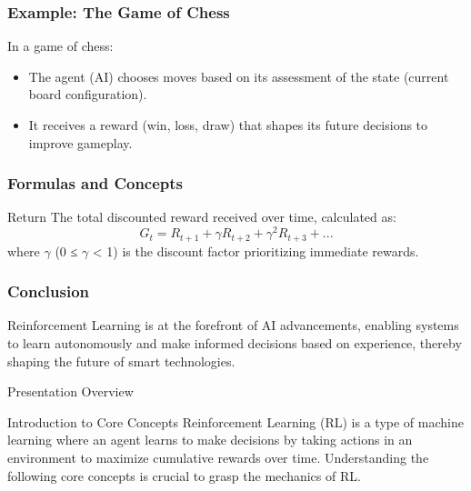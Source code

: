 \documentclass[aspectratio=169]{beamer}
\begin{document}
\begin{frame}[fragile]
    \frametitle{Example: The Game of Chess}
    In a game of chess:
    \begin{itemize}
        \item The agent (AI) chooses moves based on its assessment of the state (current board configuration).
        \item It receives a reward (win, loss, draw) that shapes its future decisions to improve gameplay.
    \end{itemize}
\end{frame}

\begin{frame}[fragile]
    \frametitle{Formulas and Concepts}
    \begin{block}{Return}
        The total discounted reward received over time, calculated as:
        \begin{equation}
            G_t = R_{t+1} + \gamma R_{t+2} + \gamma^2 R_{t+3} + ... 
        \end{equation}
        where \( \gamma \) (0 ≤ \( \gamma \) < 1) is the discount factor prioritizing immediate rewards.
    \end{block}
\end{frame}

\begin{frame}[fragile]
    \frametitle{Conclusion}
    Reinforcement Learning is at the forefront of AI advancements, enabling systems to learn autonomously and make informed decisions based on experience, thereby shaping the future of smart technologies.
\end{frame}

\begin{frame}{Presentation Overview}
  \tableofcontents[hideallsubsections]
\end{frame}

\begin{frame}{Introduction to Core Concepts}
    Reinforcement Learning (RL) is a type of machine learning where an agent learns to make decisions by taking actions in an environment to maximize cumulative rewards over time. Understanding the following core concepts is crucial to grasp the mechanics of RL.
\end{frame}
\end{document}
